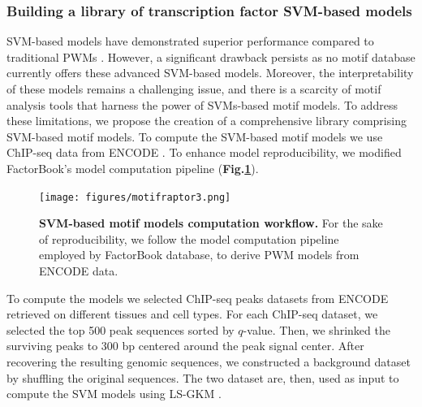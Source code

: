\documentclass[a4paper, titlepage, openright]{book}
\begin{document}
\subsubsection{Building a library of transcription factor SVM-based models}
SVM-based models have demonstrated superior performance compared to traditional PWMs \citep{tognon2023survey}. However, a significant drawback persists as no motif database currently offers these advanced SVM-based models. Moreover, the interpretability of these models remains a challenging issue, and there is a scarcity of motif analysis tools that harness the power of SVMs-based motif models. To address these limitations,  we propose the creation of a comprehensive library comprising SVM-based motif models. To compute the SVM-based motif models we use ChIP-seq data from ENCODE \citep{encode2012integrated}.  To enhance model reproducibility, we modified FactorBook's model computation pipeline \citep{pratt2022factorbook} (\textbf{Fig.\ref{fig:motifraptor3}}).
\begin{figure}
	\centering
	\texttt{[image: figures/motifraptor3.png]}
	\caption[SVM-based motif models computation workflow]{\textbf{SVM-based motif models computation workflow.} For the sake of reproducibility, we follow the model computation pipeline employed by FactorBook database, to derive PWM models from ENCODE data.}
	\label{fig:motifraptor3}
\end{figure} 
To compute the models we selected ChIP-seq peaks datasets from ENCODE retrieved on different tissues and cell types.  For each ChIP-seq dataset, we selected the top 500 peak sequences sorted by $q$-value. Then, we shrinked the surviving peaks to 300 bp centered around the peak signal center. After recovering the resulting genomic sequences, we constructed a background dataset by shuffling the original sequences. The two dataset are, then, used as input to compute the SVM models using LS-GKM \citep{lee2016ls}.
\end{document}
